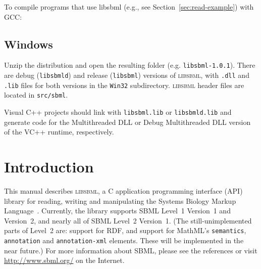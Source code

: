 \documentclass{sbmlmanual}
\begin{document}
\begin{example}[csh]
\end{example}

To compile programs that use libsbml (e.g., see
Section~\ref{sec:read-example}) with GCC:

\begin{example}[csh]
\end{example}


\subsection{Windows}

Unzip the distribution and open the resulting folder
(e.g. \texttt{libsbml-1.0.1}).  There are debug (\texttt{libsbmld})
and release (\texttt{libsbml}) versions of \textsc{libsbml}, with
\texttt{.dll} and \texttt{.lib} files for both versions in the
\texttt{Win32} subdirectory.  \textsc{libsbml} header files are
located in \texttt{src/sbml}.

Visual C++ projects should link with \texttt{libsbml.lib} or
\texttt{libsbmld.lib} and generate code for the Multithreaded DLL or
Debug Multithreaded DLL version of the VC++ runtime, respectively.


\section{Introduction}
\label{sec:introduction}

This manual describes \textsc{libsbml}, a C application programming
interface (API) library for reading, writing and manipulating the Systems
Biology Markup
Language~\citep[SBML;][]{hucka:2001,hucka:2003,finney:2003c}.  Currently,
the library supports SBML Level~1 Version~1 and Version~2, and nearly all
of SBML Level~2 Version~1.  (The still-unimplemented parts of Level~2 are:
support for RDF, and support for MathML's \texttt{semantics},
\texttt{annotation} and \texttt{annotation-xml} elements.  These will be
implemented in the near future.)  For more information about SBML, please
see the references or visit \url{http://www.sbml.org/} on the Internet.
\end{document}
